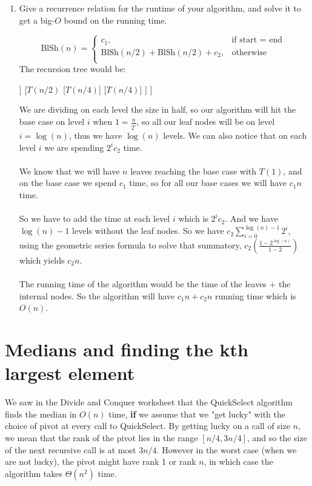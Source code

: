 \documentclass[11pt]{article}
\def\question#1{\red{#1}}
\def\soln#1{\par\blu{#1}} %
\def\blu#1{{\color{blu}#1}}
\def\red#1{{\color{red}#1}}
\begin{document}
\begin{enumerate}
\item \question{Give a recurrence relation for the runtime of your algorithm, and solve it to get a big-$O$ bound on the running time.}
\soln{
  \[
   \mbox{BlSh}(n) = \left \{\begin{array}{ll}
      c_1, & \mbox{if start = end } \\[.3in]
      \text{BlSh}(n/2) + \text{BlSh}(n/2) + c_2, & \mbox{otherwise} \\
      \end{array} \right.
   \]
  The recursion tree would be:
  \begin{center}
    \begin{forest}
      [$T(n)$
        [$T(n/2)$
          [$T(n/4)$]
          [$T(n/4)$]
        ]
        [$T(n/2)$
          [$T(n/4)$]
          [$T(n/4)$]
        ]
      ]
    \end{forest}
  \end{center}
  We are dividing on each level the size in half, so our algorithm will hit the base case on level 
  $i$ when $1 = \frac{n}{2^i}$, so all our leaf nodes will be on level $i = \log(n)$, thus we 
  have $\log(n)$ levels. We can also notice that on each level $i$ we are spending $2^ic_2$ time. \\ \\
  We know that we will have $n$ leaves reaching the base case with $T(1)$, and on the base case we 
  spend $c_1$ time, so for all our base cases we will have $c_1n$ time. \\ \\
  So we have to add the time at each level $i$ which is $2^ic_2$. And we have $\log(n)-1$ levels without 
  the leaf nodes. So we have $c_2\sum_{i=0}^{\log(n) - 1}2^i$, using the geometric series formula to 
  solve that summatory, $c_2(\frac{1-2^{\log(n)}}{1-2})$ which yields $c_2n$.  \\ \\
  The running time of the algorithm would be the time of the leaves + the internal nodes. So the 
  algorithm will have $c_1n + c_2n$ running time which is $O(n)$.
}
\end{enumerate}
\section{Medians and finding the kth largest element}
\label{sec-2}
We saw in the Divide and Conquer worksheet that the QuickSelect
algorithm finds the median in $O(n)$ time, \textbf{if} we assume that we "get
lucky" with the choice of pivot at every call to QuickSelect. By getting
lucky on a call of size $n$, we mean that the rank of the pivot lies
in the range $[n/4,3n/4]$, and so the size of the next recursive call is at
most $3n/4$.  However in the worst case (when we are not lucky),
the pivot might have rank 1 or rank $n$, in which
case the algorithm takes $\Theta(n^2)$ time.
\end{document}
